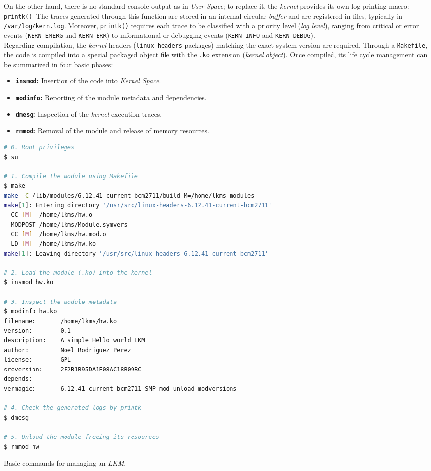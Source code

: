 On the other hand, there is no standard console output as in \textit{User Space}; to replace it, the \textit{kernel} provides its own log-printing macro: \texttt{printk()}.
The traces generated through this function are stored in an internal circular \textit{buffer} and are registered in files, typically in \texttt{/var/log/kern.log}.
Moreover, \texttt{printk()} requires each trace to be classified with a priority level (\textit{log level}), ranging from critical or error events (\texttt{KERN\_EMERG} and \texttt{KERN\_ERR}) to informational or debugging events (\texttt{KERN\_INFO} and \texttt{KERN\_DEBUG}).\\

Regarding compilation, the \textit{kernel} headers (\texttt{linux-headers} packages) matching the exact system version are required.
Through a \texttt{Makefile}, the code is compiled into a special packaged object file with the \texttt{.ko} extension (\textit{kernel object}).
Once compiled, its life cycle management can be summarized in four basic phases:

\begin{itemize}
    \item \textbf{\texttt{insmod}:} Insertion of the code into \textit{Kernel Space}.
    \item \textbf{\texttt{modinfo}:} Reporting of the module metadata and dependencies.
    \item \textbf{\texttt{dmesg}:} Inspection of the \textit{kernel} execution traces.
    \item \textbf{\texttt{rmmod}:} Removal of the module and release of memory resources.
\end{itemize}

\begin{code}[h!]
\begin{lstlisting}[language=bash]
# 0. Root privileges
$ su

# 1. Compile the module using Makefile
$ make
make -C /lib/modules/6.12.41-current-bcm2711/build M=/home/lkms modules
make[1]: Entering directory '/usr/src/linux-headers-6.12.41-current-bcm2711'
  CC [M]  /home/lkms/hw.o
  MODPOST /home/lkms/Module.symvers
  CC [M]  /home/lkms/hw.mod.o
  LD [M]  /home/lkms/hw.ko
make[1]: Leaving directory '/usr/src/linux-headers-6.12.41-current-bcm2711'

# 2. Load the module (.ko) into the kernel
$ insmod hw.ko

# 3. Inspect the module metadata
$ modinfo hw.ko
filename:       /home/lkms/hw.ko
version:        0.1
description:    A simple Hello world LKM
author:         Noel Rodriguez Perez
license:        GPL
srcversion:     2F2B1B95DA1F08AC18B09BC
depends:        
vermagic:       6.12.41-current-bcm2711 SMP mod_unload modversions

# 4. Check the generated logs by printk
$ dmesg

# 5. Unload the module freeing its resources
$ rmmod hw
\end{lstlisting}
\caption[Basic LKM management commands.]{Basic commands for managing an \textit{LKM}.}
\label{cod:lkm_commands}
\end{code}

